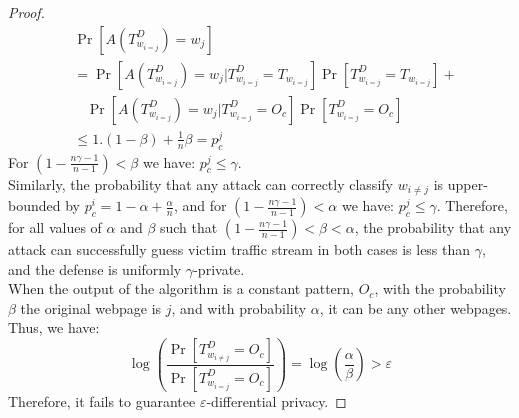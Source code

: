 \begin{proof}
    \begin{align*}
      & \Pr[A(T^{D}_{w_{i=j}}) = w_j]
      \\
      & = \Pr[A(T^D_{w_{i=j}}) = w_j | T^D_{w_{i=j}}=T_{w_{i=j}}]\Pr[T^D_{w_{i=j}}=T_{w_{i=j}}] +
      \\
      &~~~~\Pr[A(T^D_{w_{i=j}}) = w_j | T^D_{w_{i=j}}=O_c]\Pr[T^D_{w_{i=j}}=O_c]
      \\
      & \leq  1.(1-\beta) + \frac{1}{n}\beta = p_c^j
    \end{align*}
    For $(1- \frac{n\gamma - 1}{n-1}) < \beta$ we have: $p_c^j \leq \gamma$.
    \\
    Similarly, the probability that any attack can correctly classify $w_{i\neq j}$ is upper-bounded by $p_c^i = 1-\alpha + \frac{\alpha}{n}$, and for $(1- \frac{n\gamma - 1}{n-1}) < \alpha$ we have: $p_c^j \leq \gamma$.
    Therefore, for all values of $\alpha$ and $\beta$ such that $(1- \frac{n\gamma -
    1}{n-1}) < \beta < \alpha$, the probability that any attack can successfully
    guess victim traffic stream in both cases is less than $\gamma$, and
    the defense is uniformly $\gamma$-private.
    \\
    When the output of the algorithm is a constant pattern, $O_{c}$, with the probability $\beta$ the original webpage is $j$, and with probability $\alpha$, it can be any other webpages. Thus, we have:
    \begin{equation*}
    \log(\frac{\Pr[T_{w_{i\neq j}}^{D}=O_{c}]}{\Pr[T_{w_{i=j}}^{D}=O_{c}]})
    = \log(\frac{\alpha}{\beta}) > \varepsilon
    \end{equation*}
  Therefore, it fails to guarantee $\varepsilon$-differential privacy.
\end{proof}



